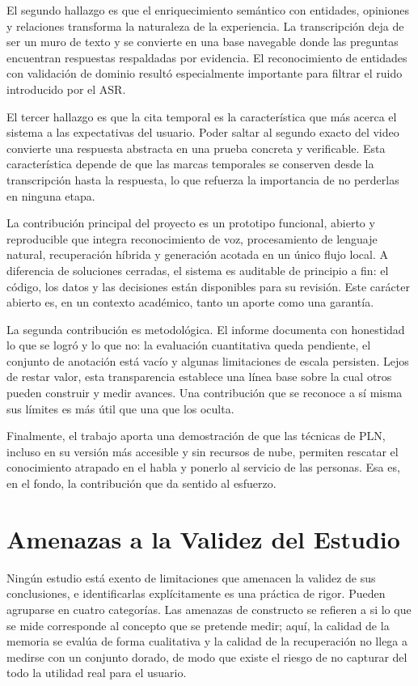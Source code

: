 \documentclass[12pt,a4paper]{article}
\begin{document}
El segundo hallazgo es que el enriquecimiento semántico con entidades, opiniones y relaciones transforma la naturaleza de la experiencia. La transcripción deja de ser un muro de texto y se convierte en una base navegable donde las preguntas encuentran respuestas respaldadas por evidencia. El reconocimiento de entidades con validación de dominio resultó especialmente importante para filtrar el ruido introducido por el ASR.

El tercer hallazgo es que la cita temporal es la característica que más acerca el sistema a las expectativas del usuario. Poder saltar al segundo exacto del video convierte una respuesta abstracta en una prueba concreta y verificable. Esta característica depende de que las marcas temporales se conserven desde la transcripción hasta la respuesta, lo que refuerza la importancia de no perderlas en ninguna etapa.

La contribución principal del proyecto es un prototipo funcional, abierto y reproducible que integra reconocimiento de voz, procesamiento de lenguaje natural, recuperación híbrida y generación acotada en un único flujo local. A diferencia de soluciones cerradas, el sistema es auditable de principio a fin: el código, los datos y las decisiones están disponibles para su revisión. Este carácter abierto es, en un contexto académico, tanto un aporte como una garantía.

La segunda contribución es metodológica. El informe documenta con honestidad lo que se logró y lo que no: la evaluación cuantitativa queda pendiente, el conjunto de anotación está vacío y algunas limitaciones de escala persisten. Lejos de restar valor, esta transparencia establece una línea base sobre la cual otros pueden construir y medir avances. Una contribución que se reconoce a sí misma sus límites es más útil que una que los oculta.

Finalmente, el trabajo aporta una demostración de que las técnicas de PLN, incluso en su versión más accesible y sin recursos de nube, permiten rescatar el conocimiento atrapado en el habla y ponerlo al servicio de las personas. Esa es, en el fondo, la contribución que da sentido al esfuerzo.



\section{Amenazas a la Validez del Estudio}
\label{sec:validez}

Ningún estudio está exento de limitaciones que amenacen la validez de sus conclusiones, e identificarlas explícitamente es una práctica de rigor. Pueden agruparse en cuatro categorías. Las amenazas de constructo se refieren a si lo que se mide corresponde al concepto que se pretende medir; aquí, la calidad de la memoria se evalúa de forma cualitativa y la calidad de la recuperación no llega a medirse con un conjunto dorado, de modo que existe el riesgo de no capturar del todo la utilidad real para el usuario.
\end{document}
